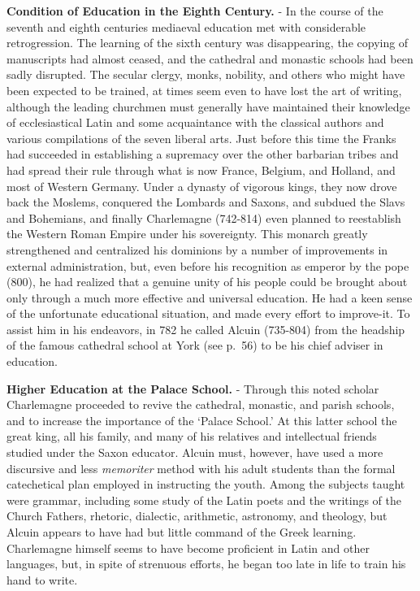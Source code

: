 \documentclass[]{book}
\begin{document}
\textbf{Condition of Education in the Eighth Century.} - In the course of the seventh and eighth centuries mediaeval education met with considerable retrogression. The learning of the sixth century was disappearing, the copying of manuscripts had almost ceased, and the cathedral and monastic schools had been sadly disrupted. The secular clergy, monks, nobility, and others who might have been expected to be trained, at times seem even to have lost the art of writing, although the leading churchmen must generally have maintained their knowledge of ecclesiastical Latin and some acquaintance with the classical authors and various compilations of the seven liberal arts. Just before this time the Franks had succeeded in establishing a supremacy over the other barbarian tribes and had spread their rule through what is now France, Belgium, and Holland, and most of Western Germany. Under a dynasty of vigorous kings, they now drove back the Moslems, conquered the Lombards and Saxons, and subdued the Slavs and Bohemians, and finally Charlemagne (742-814) even planned to reestablish the Western Roman Empire under his sovereignty. This monarch greatly strengthened and centralized his dominions by a number of improvements in external administration, but, even before his recognition as emperor by the pope (800), he had realized that a genuine unity of his people could be brought about only through a much more effective and universal education. He had a keen sense of the unfortunate educational situation, and made every effort to improve-it. To assist him in his endeavors, in 782 he called Alcuin (735-804) from the headship of the famous cathedral school at York (see p.~56) to be his chief adviser in education.

\textbf{Higher Education at the Palace School.} - Through this noted scholar Charlemagne proceeded to revive the cathedral, monastic, and parish schools, and to increase the importance of the `Palace School.' At this latter school the great king, all his family, and many of his relatives and intellectual friends studied under the Saxon educator. Alcuin must, however, have used a more discursive and less \emph{memoriter} method with his adult students than the formal catechetical plan employed in instructing the youth. Among the subjects taught were grammar, including some study of the Latin poets and the writings of the Church Fathers, rhetoric, dialectic, arithmetic, astronomy, and theology, but Alcuin appears to have had but little command of the Greek learning. Charlemagne himself seems to have become proficient in Latin and other languages, but, in spite of strenuous efforts, he began too late in life to train his hand to write.
\end{document}
